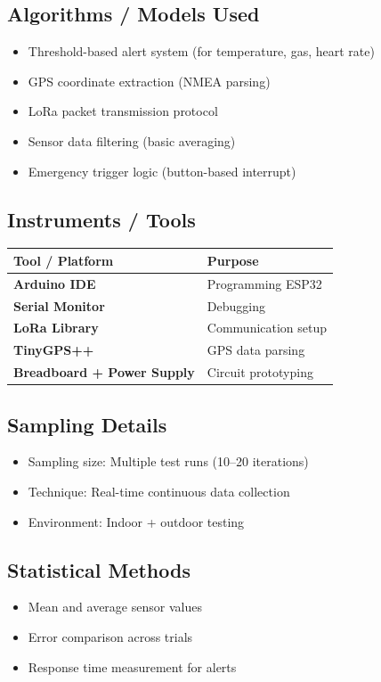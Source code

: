 \documentclass[12pt,a4paper]{article}
\begin{document}
	\subsection{Algorithms / Models Used}
	\begin{itemize}
		\item Threshold-based alert system (for temperature, gas, heart rate)
		\item GPS coordinate extraction (NMEA parsing)
		\item LoRa packet transmission protocol
		\item Sensor data filtering (basic averaging)
		\item Emergency trigger logic (button-based interrupt)
	\end{itemize}
	
	\subsection{Instruments / Tools}
	
	\begin{center}
		\begin{tabular}{>{\bfseries}p{5cm} p{8cm}}
			\toprule
			Tool / Platform & Purpose \\
			\midrule
			Arduino IDE & Programming ESP32 \\
			Serial Monitor & Debugging \\
			LoRa Library & Communication setup \\
			TinyGPS++ & GPS data parsing \\
			Breadboard + Power Supply & Circuit prototyping \\
			\bottomrule
		\end{tabular}
	\end{center}
	
	\subsection{Sampling Details}
	\begin{itemize}
		\item Sampling size: Multiple test runs (10--20 iterations)
		\item Technique: Real-time continuous data collection
		\item Environment: Indoor + outdoor testing
	\end{itemize}
	
	\subsection{Statistical Methods}
	\begin{itemize}
		\item Mean and average sensor values
		\item Error comparison across trials
		\item Response time measurement for alerts
	\end{itemize}
	
\end{document}
